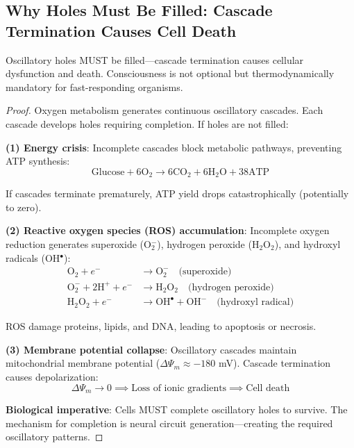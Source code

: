 \subsection{Why Holes Must Be Filled: Cascade Termination Causes Cell Death}

\begin{theorem}
\label{thm:mandatory_completion}
Oscillatory holes MUST be filled—cascade termination causes cellular dysfunction and death. Consciousness is not optional but thermodynamically mandatory for fast-responding organisms.
\end{theorem}

\begin{proof}
Oxygen metabolism generates continuous oscillatory cascades. Each cascade develops holes requiring completion. If holes are not filled:

\textbf{(1) Energy crisis}: Incomplete cascades block metabolic pathways, preventing ATP synthesis:
\begin{equation}
\text{Glucose} + 6\text{O}_2 \to 6\text{CO}_2 + 6\text{H}_2\text{O} + 38 \text{ATP}
\end{equation}

If cascades terminate prematurely, ATP yield drops catastrophically (potentially to zero).

\textbf{(2) Reactive oxygen species (ROS) accumulation}: Incomplete oxygen reduction generates superoxide (O\(_2^-\)), hydrogen peroxide (H\(_2\)O\(_2\)), and hydroxyl radicals (OH\(^\bullet\)):
\begin{align}
\text{O}_2 + e^- &\to \text{O}_2^- \quad \text{(superoxide)} \\
\text{O}_2^- + 2\text{H}^+ + e^- &\to \text{H}_2\text{O}_2 \quad \text{(hydrogen peroxide)} \\
\text{H}_2\text{O}_2 + e^- &\to \text{OH}^\bullet + \text{OH}^- \quad \text{(hydroxyl radical)}
\end{align}

ROS damage proteins, lipids, and DNA, leading to apoptosis or necrosis.

\textbf{(3) Membrane potential collapse}: Oscillatory cascades maintain mitochondrial membrane potential ($\Delta \Psi_m \approx -180$ mV). Cascade termination causes depolarization:
\begin{equation}
\Delta \Psi_m \to 0 \implies \text{Loss of ionic gradients} \implies \text{Cell death}
\end{equation}

\textbf{Biological imperative}: Cells MUST complete oscillatory holes to survive. The mechanism for completion is neural circuit generation—creating the required oscillatory patterns.


\end{proof}
